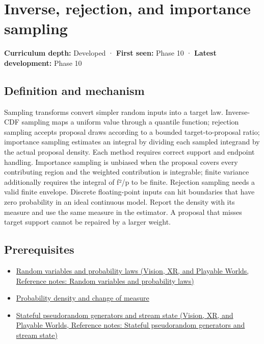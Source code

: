 \hypertarget{appendix-8d863ed954d0}{}\label{referencestart:appendix-8d863ed954d0}
\section{Inverse, rejection, and importance sampling}\label{appendix-8d863ed954d0-inverse-rejection-and-importance-sampling}

\textbf{Curriculum depth:} Developed · \textbf{First seen:} Phase 10 · \textbf{Latest development:} Phase 10

\subsection{Definition and mechanism}\label{appendix-8d863ed954d0-definition-and-mechanism}

Sampling transforms convert simpler random inputs into a target law. Inverse-CDF sampling maps a uniform value through a quantile function; rejection sampling accepts proposal draws according to a bounded target-to-proposal ratio; importance sampling estimates an integral by dividing each sampled integrand by the actual proposal density. Each method requires correct support and endpoint handling. Importance sampling is unbiased when the proposal covers every contributing region and the weighted contribution is integrable; finite variance additionally requires the integral of f²/p to be finite. Rejection sampling needs a valid finite envelope. Discrete floating-point inputs can hit boundaries that have zero probability in an ideal continuous model. Report the density with its measure and use the same measure in the estimator. A proposal that misses target support cannot be repaired by a larger weight.

\subsection{Prerequisites}\label{appendix-8d863ed954d0-prerequisites}

\begin{itemize}
\tightlist
\item
  \href{../07-Vision-XR-and-Playable-Worlds/main.pdf\#nameddest=appendix-4d0203f7944f}{Random variables and probability laws (Vision, XR, and Playable Worlds, Reference notes: Random variables and probability laws)}
\item
  \hyperref[appendix-4815cd87ab8b]{Probability density and change of measure}
\item
  \href{../07-Vision-XR-and-Playable-Worlds/main.pdf\#nameddest=appendix-e0f7c7e08f3a}{Stateful pseudorandom generators and stream state (Vision, XR, and Playable Worlds, Reference notes: Stateful pseudorandom generators and stream state)}
\end{itemize}

